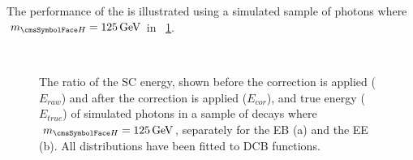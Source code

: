 The performance of the \PhoEnergyBdt is illustrated using a simulated sample of \Hgg photons where $\mH=125\GeV$ in \Fig~\ref{fig:reco:pho_regression}.

\begin{figure}[h]
\centering
{}\\
\caption{The ratio of the SC energy, shown before the \PhoEnergyBdt correction is applied ($E_{raw}$) and after the correction is applied ($E_{cor}$), and true energy ($E_{true}$) of simulated photons in a sample of \Hgg decays where $\mH=125\GeV$, separately for the EB (a) and the EE (b). All distributions have been fitted to DCB functions.}

\label{fig:reco:pho_regression}
\end{figure}


